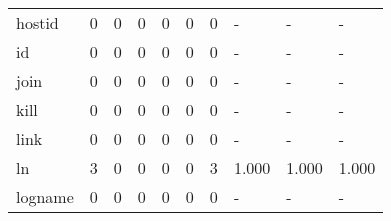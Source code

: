 \begin{longtable}{lp{1.3cm}p{1.3cm}p{1.3cm}p{1.3cm}p{1.3cm}p{1.3cm}p{1.3cm}p{1.3cm}p{1.3cm}}
hostid    &                      0 &                                             0 &                                            0 &                                           0 &                                            0 &                                          0 &                                    - &                                      - &                                    - \\
id        &                      0 &                                             0 &                                            0 &                                           0 &                                            0 &                                          0 &                                    - &                                      - &                                    - \\
join      &                      0 &                                             0 &                                            0 &                                           0 &                                            0 &                                          0 &                                    - &                                      - &                                    - \\
kill      &                      0 &                                             0 &                                            0 &                                           0 &                                            0 &                                          0 &                                    - &                                      - &                                    - \\
link      &                      0 &                                             0 &                                            0 &                                           0 &                                            0 &                                          0 &                                    - &                                      - &                                    - \\
ln        &                      3 &                                             0 &                                            0 &                                           0 &                                            0 &                                          3 &                                1.000 &                                  1.000 &                                1.000 \\
logname   &                      0 &                                             0 &                                            0 &                                           0 &                                            0 &                                          0 &                                    - &                                      - &                                    - \\

\end{longtable}
